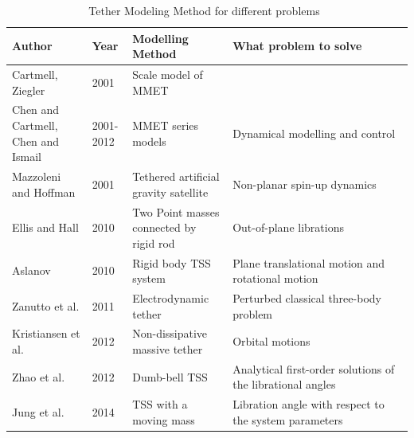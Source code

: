 \begin{table}[h!]
\renewcommand\arraystretch{2}
	\begin{center}
	\caption{Tether Modeling Method for different problems~\cite{chen2013history}}
	\begin{tabular}{p{0.2\linewidth}|p{0.1\linewidth}|p{0.25\linewidth}|p{0.45\linewidth}}
	\toprule
	\textbf{Author} & \textbf{Year} & \textbf{Modelling Method} & \textbf{What problem to solve}\\
	\midrule
	Cartmell, Ziegler & 2001 & Scale model of MMET & \\
	Chen and Cartmell, Chen and Ismail & 2001-2012 & MMET series models & Dynamical modelling and control\\
	Mazzoleni and Hoffman & 2001 & Tethered artificial gravity satellite & Non-planar spin-up dynamics\\
	Ellis and Hall&	2010&	Two Point masses connected by rigid rod & Out-of-plane librations\\
	Aslanov &	2010&	Rigid body TSS system	& Plane translational motion and rotational motion\\
	Zanutto et al.& 2011 & Electrodynamic tether & Perturbed classical three-body problem\\
	Kristiansen et al.&	2012 &	Non-dissipative massive tether & Orbital motions\\
	Zhao et al.	&2012&	Dumb-bell TSS & Analytical first-order solutions of the librational angles\\
	Jung et al. & 2014 &	TSS with a moving mass & Libration angle with respect to the system parameters\\
	\bottomrule
	\end{tabular}	
	\end{center}
\end{table}



\newpage
